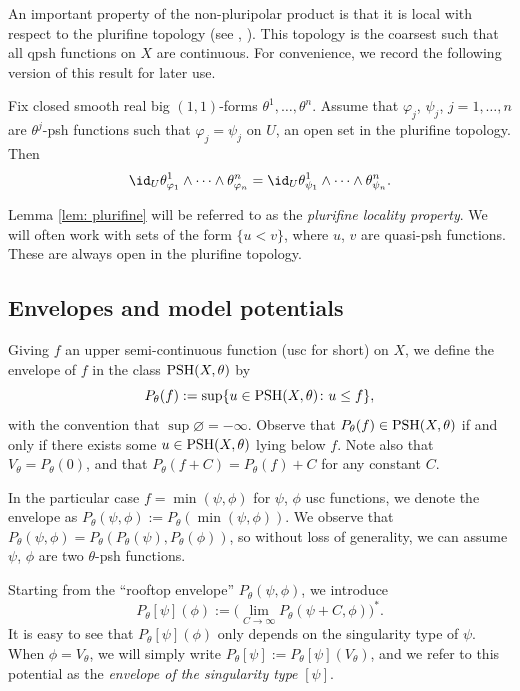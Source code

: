 An important property of the non-pluripolar product is that it is local with respect to the plurifine topology (see \cite[Corollary~4.3]{BT87}, \cite[Section~1.2]{BEGZ10}).
This topology is the coarsest such that all qpsh functions on $X$ are continuous. For convenience, we record the following version of this result for later use.

\begin{Lemma} \label{lem: plurifine}
Fix closed smooth real big $(1,1)$-forms $\theta^1,\dots,\theta^n$. Assume that $\varphi_j$, $\psi_j$, $j=1,\dots,n$ are $\theta^j$-psh functions such that $\varphi_j =\psi_j$ on $U$, an open set in the plurifine topology. Then
\[
\id_{U} \theta^1_{\varphi_1} \wedge \dots \wedge \theta^n_{\varphi_n} = \id_{U} \theta^1_{\psi_1} \wedge\dots \wedge \theta^n_{\psi_n}.
\]
\end{Lemma}
Lemma \ref{lem: plurifine} will be referred to as the \emph{plurifine locality property}. We will often work with sets of the form $\{u<v\}$, where $u$, $v$ are quasi-psh functions. These are always open in the plurifine topology.

\subsection{Envelopes and model potentials}
Giving $f$ an upper semi-continuous function (usc for short) on $X$, we define the envelope of $f$ in the class ${\rm PSH}(X,\theta)$ by
\[
P_{\theta}(f) := \sup \{u\in {\rm PSH}(X,\theta) \colon u\leq f\},
\]
with the convention that $\sup\varnothing =-\infty$. Observe that $P_{\theta}(f)\in {\rm PSH}(X,\theta)$ if and only if there exists some $u\in {\rm PSH}(X,\theta)$ lying below $f$. Note also that $V_{\theta}=P_{\theta}(0)$, and that $P_{\theta}(f+C)= P_{\theta}(f)+C$ for any constant $C$.

 In the particular case $f=\min(\psi,\phi)$ for $\psi$, $\phi$ usc functions, we denote the envelope as
$ P_\theta(\psi,\phi):=P_\theta(\min(\psi,\phi))$.
We observe that $ P_\theta(\psi,\phi)= P_\theta(P_\theta(\psi),P_\theta(\phi))$, so without loss of generality, we can assume $\psi$, $\phi$ are two $\theta$-psh functions.

Starting from the ``rooftop envelope'' $ P_\theta(\psi,\phi)$, we introduce
\[P_\theta[\psi](\phi) := \big(\lim_{C \to \infty}P_\theta(\psi+C,\phi)\big)^*.\]
It is easy to see that $P_\theta[\psi](\phi)$ only depends on the singularity type of $\psi$. When $\phi = V_\theta$, we will simply write $P_\theta[\psi]:=P_\theta[\psi](V_\theta)$, and we refer to this potential as the \emph{envelope of the singularity type} $[\psi]$.

